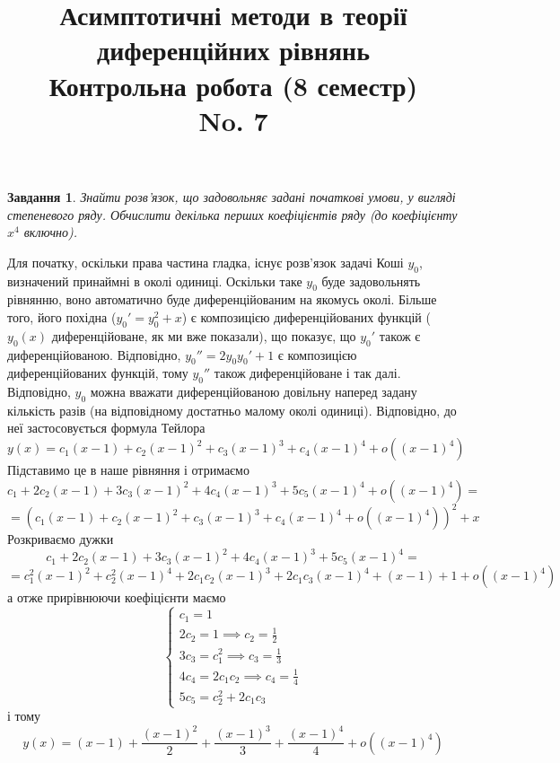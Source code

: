 \documentclass[12pt]{article} %
\title{
Асимптотичні методи в теорії диференційних рівнянь\\
Контрольна робота (8 семестр)\\
No. 7}
\newtheorem{prob}{Завдання}
\begin{document}
\maketitle
\begin{prob}Знайти розв’язок, що задовольняє задані початкові умови, у вигляді степеневого ряду. Обчислити декілька перших
коефіцієнтів ряду (до коефіцієнту $x^4$ включно).\end{prob}%
Для початку, оскільки права частина гладка, існує розв’язок задачі Коші $y_0$, визначений принаймні в околі одиниці. Оскільки таке $y_0$ буде
задовольнять рівнянню, воно автоматично буде диференційованим на якомусь околі. Більше того, його похідна ($y_0'=y_0^2+x$) є композицією
диференційованих функцій ($y_0(x)$ диференційоване, як ми вже показали), що показує, що $y_0'$ також є диференційованою. Відповідно,
$y_0''=2y_0y_0'+1$ є композицією диференційованих функцій, тому $y_0''$ також диференційоване і так далі. Відповідно, $y_0$ можна вважати
диференційованою довільну наперед задану кількість разів (на відповідному достатньо малому околі одиниці). Відповідно, до неї застосовується
формула Тейлора
\[y(x)=c_1(x-1)+c_2(x-1)^2+c_3(x-1)^3+c_4(x-1)^4+o((x-1)^4)\]
Підставимо це в наше рівняння і отримаємо
\[c_1+2c_2(x-1)+3c_3(x-1)^2+4c_4(x-1)^3+5c_5(x-1)^4+o((x-1)^4)=\]
\[=(c_1(x-1)+c_2(x-1)^2+c_3(x-1)^3+c_4(x-1)^4+o((x-1)^4))^2+x\]
Розкриваємо дужки
\[c_1+2c_2(x-1)+3c_3(x-1)^2+4c_4(x-1)^3+5c_5(x-1)^4=\]\[=c_1^2(x-1)^2+c_2^2(x-1)^4+2c_1c_2(x-1)^3+2c_1c_3(x-1)^4
+(x-1)+1+o((x-1)^4)\]
а отже прирівнюючи коефіцієнти маємо 
\[\begin{cases}
	c_1=1\\
	2c_2=1\implies c_2=\frac{1}{2}\\
	3c_3=c_1^2\implies c_3=\frac{1}{3}\\
	4c_4=2c_1c_2\implies c_4=\frac{1}{4}\\
	5c_5=c_2^2+2c_1c_3
\end{cases}\]
і тому
\[y(x)=(x-1)+\frac{(x-1)^2}{2}+\frac{(x-1)^3}{3}+\frac{(x-1)^4}{4}+o((x-1)^4)\]
\end{document}
